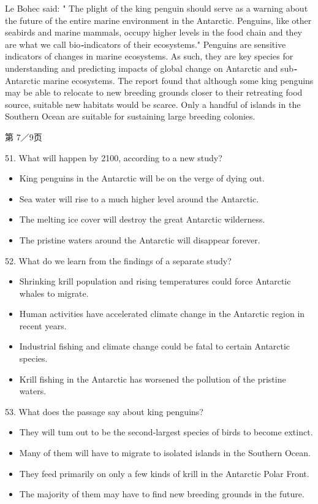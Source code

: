 \documentclass[UTF8,11pt]{ctexart}
\begin{document}
Le Bohec said: " The plight of the king penguin should serve as a warning about the future of the entire marine environment in the Antarctic. Penguins, like other seabirds and marine mammals, occupy higher levels in the food chain and they are what we call bio\textbf{\textit{-}}indicators of their ecosystems." Penguins are sensitive indicators of changes in marine ecosystems. As such, they are key species for understanding and predicting impacts of global change on Antarctic and sub\textbf{\textit{-}}Antarctic marine ecosystems. The report found that although some king penguins may be able to relocate to new breeding grounds closer to their retreating food source, suitable new habitats would be scarce. Only a handful of islands in the Southern Ocean are suitable for sustaining large breeding colonies.


第 7／9页


51. What will happen by 2100, according to a new study?


\begin{itemize}[leftmargin=2em,itemsep=.2em,topsep=.4em]\item[A.] King penguins in the Antarctic will be on the verge of dying out.
\item[B.] Sea water will rise to a much higher level around the Antarctic.
\item[C.] The melting ice cover will destroy the great Antarctic wilderness.
\item[D.] The pristine waters around the Antarctic will disappear forever.
\end{itemize}

52. What do we learn from the findings of a separate study?


\begin{itemize}[leftmargin=2em,itemsep=.2em,topsep=.4em]\item[A.] Shrinking krill population and rising temperatures could force Antarctic whales to migrate.
\item[B.] Human activities have accelerated climate change in the Antarctic region in recent years.
\item[C.] Industrial fishing and climate change could be fatal to certain Antarctic species.
\item[D.] Krill fishing in the Antarctic has worsened the pollution of the pristine waters.
\end{itemize}

53. What does the passage say about king penguins?


\begin{itemize}[leftmargin=2em,itemsep=.2em,topsep=.4em]\item[A.] They will tum out to be the second-largest species of birds to become extinct.
\item[B.] Many of them will have to migrate to isolated islands in the Southern Ocean.
\item[C.] They feed primarily on only a few kinds of krill in the Antarctic Polar Front.
\item[D.] The majority of them may have to find new breeding grounds in the future.
\end{itemize}
\end{document}
